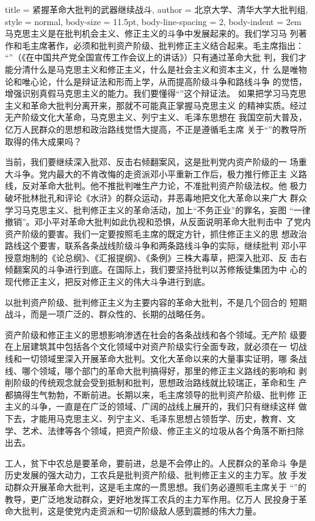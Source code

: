 \begin{hongqiarticle}{
        title  = {紧握革命大批判的武器继续战斗},
        author = {北京大学、清华大学大批判组},
        style  = normal,
        body-size = 11.5pt,
        body-line-spacing = 2,
        body-indent = 2em
    }
    马克思主义是在批判机会主义、修正主义的斗争中发展起来的。我们学习马
    列著作和毛主席著作，必须和批判资产阶级、批判修正主义结合起来。毛主席指出：
    “”（《在中国共产党全国宣传工作会议上的讲话》）只有通过革命大批
    判，我们才能分清什么是马克思主义和修正主义，什么是社会主义和资本主义，什
    么是唯物论和唯心论，什么是辩证法和形而上学，从而提高阶级斗争和路线斗争
    的觉悟，增强识别真假马克思主义的能力。我们要懂得“”这个辩证法。
    如果把学习马克思主义和革命大批判分离开来，那就不可能真正掌握马克思主义
    的精神实质。经过无产阶级文化大革命，马克思主义、列宁主义、毛泽东思想在
    我国空前大普及，亿万人民群众的思想和政治路线觉悟大提高，不正是遵循毛主席
    关于“”的教导所取得的伟大成果吗？
    
    当前，我们要继续深入批邓、反击右倾翻案风，这是批判党内资产阶级的一
    场重大斗争。党内最大的不肯改悔的走资派邓小平重新工作后，极力推行修正主
    义路线，反对革命大批判。他不推批判唯生产力论，不准批判资产阶级法权。他
    极力破坏批林批孔和评论《水浒》的群众运动，井恶毒地把文化大革命以来广大
    群众学习马克思主义、批判修正主义的革命活动，加上“不务正业”的罪名，妄图
    “一律撤销”。邓小平对革命大批判如此仇视和恐惧，从反面说明革命大批判击中
    了党内资产阶级的要害。我们一定要按照毛主席的既定方针，抓住修正主义的思
    想政治路线这个要害，联系各条战线阶级斗争和两条路线斗争的实际，继续批判
    邓小平授意炮制的《论总纲》、《汇报提纲》、《条例》三株大毒草，把深入批邓、反
    击右倾翻案风的斗争进行到底。在国际上，我们要坚持批判以苏修叛徒集团为中
    心的现代修正主义，把反对修正主义的伟大斗争进行到底。
    
    以批判资产阶级、批判修正主义为主要内容的革命大批判，不是几个回合的
    短期战斗，而是一项广泛的、群众性的、长期的战略任务。
    
    资产阶级和修正主义的思想影响渗透在社会的各条战线和各个领域。无产阶
    级要在上层建筑其中包括各个文化领域中对资产阶级实行全面专政，就必须在一
    切战线和一切领域里深入开展革命大批判。文化大革命以来的大量事实证明，哪
    条战线、哪个领域，哪个部门的革命大批判搞得好，那里的修正主义路线的影响和
    剥削阶级的传统观念就会受到抵制和批判，思想政治路线就比较瑞正，革命和生
    产都搞得生气勃勃，不断前进。长期以来，毛主席领导的批判资产阶级、批判修
    正主义的斗争，一直是在广泛的领域、广阔的战线上展开的，我们只有继续这样
    做下去，才能用马克思主义、列宁主义、毛泽东思想占领哲学、历史，教育、文
    学、艺术、法律等各个领域，把资产阶级、修正主义的垃圾从各个角落不断扫除
    出去。
    
    工人，贫下中农总是要革命，要前进，总是不会停止的。人民群众的革命斗
    争是历史发展的强大动力，工农兵是批判资产阶级、批判修正主义的主力军。放
    手发动群众开展革命大批判，这是毛主席的一贯思想。我们务必遵照毛主席关于
    “”的教导，更广泛地发动群众，更好地发挥工农兵的主力军作用。亿万人
    民投身于革命大批判，这是使党内走资派和一切阶级敌人感到震撼的伟大力量。
    

\end{hongqiarticle}
